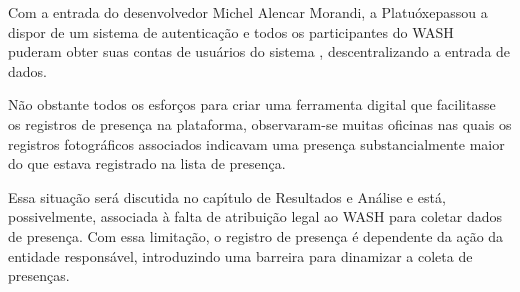 \documentclass[
12pt,		%
openright,	%
twoside,  %
a4paper,			%
chapter=TITLE,		%
english,			%
french,				%
spanish,			%
brazil				%
]{USPSC-classe/USPSC}
\begin{document}
Com a entrada do desenvolvedor Michel Alencar Morandi, a \textquotedbl Platu\'oxe\textquotedbl  passou a dispor de um sistema de autentica\c{c}\~ao e todos os participantes do WASH puderam obter suas \textquotedbl contas de usu\'arios do sistema \textquotedbl , descentralizando a entrada de dados.

















N\~ao obstante todos os esfor\c{c}os para criar uma ferramenta digital que facilitasse os registros de presen\c{c}a na plataforma, observaram-se muitas oficinas nas quais os registros fotogr\'aficos associados indicavam uma presen\c{c}a substancialmente maior do que estava registrado na lista de presen\c{c}a.


















\noindent\begin{center}\mbox{\centering{}}\end{center}


Essa situa\c{c}\~ao ser\'a discutida no cap\'{\i}tulo de Resultados e An\'alise e est\'a, possivelmente, associada \`a falta de atribui\c{c}\~ao legal ao WASH para coletar dados de presen\c{c}a. Com essa limita\c{c}\~ao, o registro de presen\c{c}a \'e dependente da a\c{c}\~ao da entidade respons\'avel, introduzindo uma barreira para dinamizar a coleta de presen\c{c}as.
\end{document}
